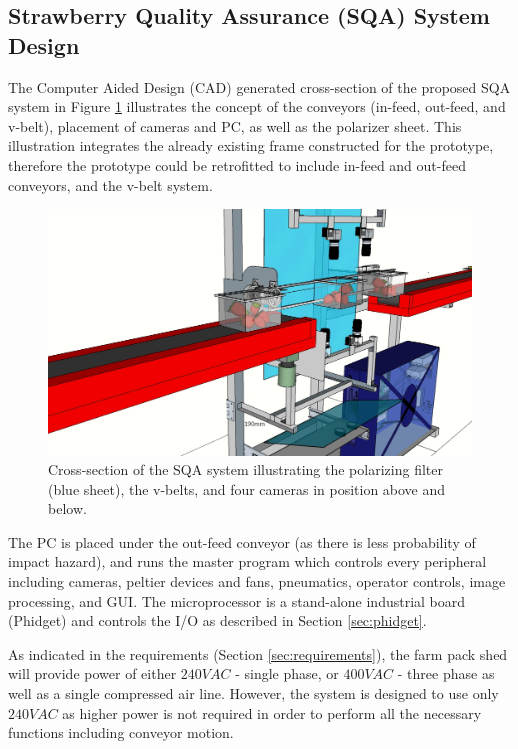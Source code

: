 \documentclass[fleqn,twoside]{article}
\begin{document}
\subsection{Strawberry Quality Assurance (SQA) System Design}


The Computer Aided Design (CAD) generated cross-section of the proposed SQA system in Figure \ref{fig:cross_sec} illustrates the concept of the conveyors (in-feed, out-feed, and v-belt), placement of cameras and PC, as well as the polarizer sheet. This illustration integrates the already existing frame constructed for the prototype, therefore the prototype could be retrofitted to include in-feed and out-feed conveyors, and the v-belt system.  



\begin{figure}[h]
	\centering
	\includegraphics[width=.8\linewidth]{QAS_cross_sec.jpg}
	\caption{Cross-section of the SQA system illustrating the polarizing filter (blue sheet), the v-belts, and four cameras in position above and below.}
	\label{fig:cross_sec}
\end{figure}%



The PC is placed under the out-feed conveyor (as there is less probability of impact hazard), and runs the master program which controls every peripheral including cameras, peltier devices and fans, pneumatics, operator controls, image processing, and GUI. The microprocessor is a stand-alone industrial board (Phidget\texttrademark) and controls the I/O as described in Section \ref{sec:phidget}.

As indicated in the requirements (Section \ref{sec:requirements}), the farm pack shed will provide power of either $240VAC$ - single phase, or $400VAC$ - three phase as well as a single compressed air line. However, the system is designed to use only $240VAC$ as higher power is not required in order to perform all the necessary functions including conveyor motion.
\end{document}
